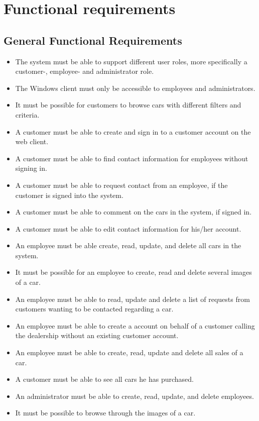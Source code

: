 \section{Functional requirements}

\subsection{General Functional Requirements}
\begin{itemize}
	\item The system must be able to support different user roles, more specifically a customer-, employee- and administrator role.
	\item The Windows client must only be accessible to employees and administrators.
    \item It must be possible for customers to browse cars with different filters and criteria.
    \item A customer must be able to create and sign in to a customer account on the web client.
    \item A customer must be able to find contact information for employees without signing in.
    \item A customer must be able to request contact from an employee, if the customer is signed into the system.
    \item A customer must be able to comment on the cars in the system, if signed in.
    \item A customer must be able to edit contact information for his/her account.
    \item An employee must be able create, read, update, and delete all cars in the system.
    \item It must be possible for an employee to create, read and delete several images of a car.
    \item An employee must be able to read, update and delete a list of requests from customers wanting to be contacted regarding a car.
    \item An employee must be able to create a account on behalf of a customer calling the dealership without an existing customer account.
    \item An employee must be able to create, read, update and delete all sales of a car.
    \item A customer must be able to see all cars he has purchased.
    \item An administrator must be able to create, read, update, and delete employees.
    \item It must be possible to browse through the images of a car.

\end{itemize}

